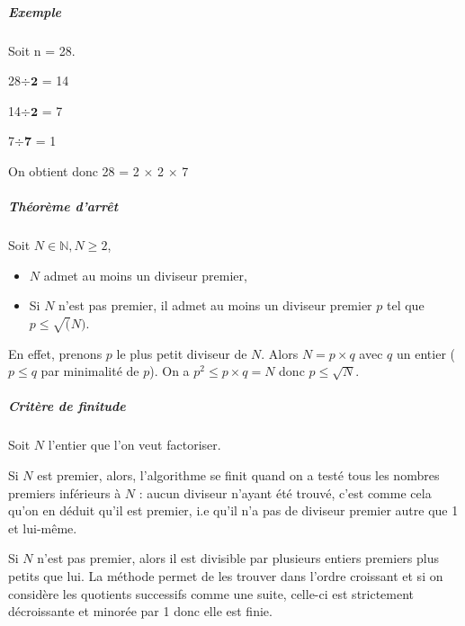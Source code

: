 \documentclass[11pt,a4paper]{article}
\begin{document}
	\subparagraph{Exemple}
	Soit n = 28.
	
	28$\div$$\mathbf{2}$ = 14
	
	14$\div$$\mathbf{2}$ = 7
	
	7$\div$$\mathbf{7}$ = 1
	
	On obtient donc 28 = 2 $\times$ 2 $\times$ 7
	
	\subparagraph{Théorème d'arrêt}
	
	Soit $N \in \mathbb{N}, N \ge 2$, 
	\begin{itemize}
		\item $N$ admet au moins un diviseur premier,
		\item Si $N$ n'est pas premier, il admet au moins un diviseur premier $p$ tel que $p \le \sqrt(N)$.
	\end{itemize}
	
	En effet, prenons $p$ le plus petit diviseur de $N$. Alors $N = p \times q$  avec $q$ un entier ($p \le q$ par minimalité de $p$). On a ${p^2 \le p \times q = N}$ donc $p \le \sqrt{N}$. 
	
	\subparagraph{Critère de finitude}	
	
	Soit $N$ l'entier que l'on veut factoriser. 
	
	Si $N$ est premier, alors, l'algorithme se finit quand on a testé tous les nombres premiers inférieurs à $N$ : aucun diviseur n'ayant été trouvé, c'est comme cela qu'on en déduit qu'il est premier, i.e qu'il n'a pas de diviseur premier autre que 1 et lui-même. 
	
	Si $N$ n'est pas premier, alors il est divisible par plusieurs entiers premiers plus petits que lui. La méthode permet de les trouver dans l'ordre croissant et si on considère les quotients successifs comme une suite, celle-ci est strictement décroissante et minorée par 1 donc elle est finie.
	
\end{document}
